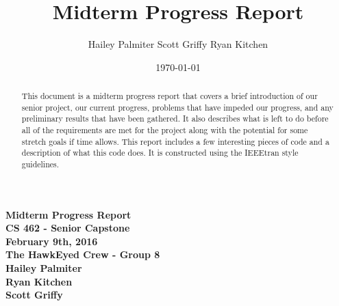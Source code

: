 \documentclass[letterpaper,10pt,titlepage]{IEEEtran}
\title{Midterm Progress Report}
\author{Hailey Palmiter Scott Griffy Ryan Kitchen}
\date{\today}
\begin{document}
   \begin{titlepage}
      \centering
      \vfill
      {\bfseries\Large
         Midterm Progress Report \\
         CS 462 - Senior Capstone\\
         \vskip2cm
         February 9th, 2016\\
         \vskip2cm
         The HawkEyed Crew - Group 8\\ 
         \vskip1cm
         Hailey Palmiter\\
         \vskip1cm
         Ryan Kitchen\\
         \vskip1cm
         Scott Griffy\\
    
      }
      \vfill
      \vskip2cm
      \begin{abstract}
      This document is a midterm progress report that covers a brief introduction of our senior project, our current progress, problems that have impeded our progress, and any preliminary results that have been gathered. It also describes what is left to do before all of the requirements are met for the project along with the potential for some stretch goals if time allows. This report includes a few interesting pieces of code and a description of what this code does. It is constructed using the IEEEtran style guidelines.
      \end{abstract}
      \vfill
   \end{titlepage}
   
   \onecolumn
   \tableofcontents
   \newpage
   \bigskip
\end{document}
